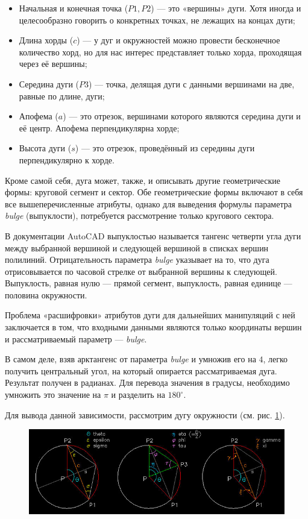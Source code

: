 \begin{itemize}
	\item Начальная и конечная точка ($P1, P2$) --- это «вершины» дуги. Хотя иногда и целесообразно говорить о конкретных точках, не лежащих на концах дуги;
	\item Длина хорды ($c$) --- у дуг и окружностей можно провести бесконечное количество хорд, но для нас интерес представляет только хорда, проходящая через её вершины;
	\item Середина дуги ($P3$) --- точка, делящая дуги с данными вершинами на две, равные по длине, дуги;
	\item Апофема ($a$) --- это отрезок, вершинами которого являются середина дуги и её центр. Апофема перпендикулярна хорде;
	\item Высота дуги ($s$) --- это отрезок, проведённый из середины дуги перпендикулярно к хорде.
\end{itemize}

Кроме самой себя, дуга может, также, и описывать другие геометрические формы: круговой сегмент и сектор. Обе геометрические формы включают в себя все вышеперечисленные атрибуты, однако для выведения формулы параметра \textit{bulge} (выпуклости), потребуется рассмотрение только кругового сектора.

В документации AutoCAD \cite{autocad2012dxf} выпуклостью называется тангенс четверти угла дуги между выбранной вершиной и следующей вершиной в списках вершин полилиний. Отрицательность параметра \textit{bulge} указывает на то, что дуга отрисовывается по часовой стрелке от выбранной вершины к следующей. Выпуклость, равная нулю --- прямой сегмент, выпуклость, равная единице --- половина окружности.

Проблема «расшифровки» атрибутов дуги для дальнейших манипуляций с ней заключается в том, что входными данными являются только координаты вершин и рассматриваемый параметр --- \textit{bulge}.

В самом деле, взяв арктангенс от параметра \textit{bulge} и умножив его на $4$, легко получить центральный угол, на который опирается рассматриваемая дуга. Результат получен в радианах. Для перевода значения в градусы, необходимо умножить это значение на $\pi$ и разделить на $180^{\circ}$.

Для вывода данной зависимости, рассмотрим дугу окружности (см. рис. \ref{fig:arcchord}).

\begin{figure}[H]
	\centering
	\includegraphics[width=1.0\textwidth]{figures/arcchord.png}
	\label{fig:arcchord}
\end{figure}


